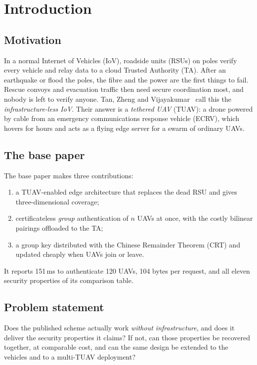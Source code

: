 \chapter{Introduction}\label{sec:intro}

\section{Motivation}
In a normal Internet of Vehicles (IoV), roadside units (RSUs) on poles verify every vehicle and relay data to a cloud Trusted Authority (TA).
After an earthquake or flood the poles, the fibre and the power are the first things to fail. Rescue convoys and evacuation traffic then need secure
coordination most, and nobody is left to verify anyone. Tan, Zheng and Vijayakumar~\cite{base} call this the \emph{infrastructure-less IoV}.
Their answer is a \emph{tethered UAV} (TUAV): a drone powered by cable from an emergency communications response vehicle (ECRV), which hovers for hours
and acts as a flying edge server for a swarm of ordinary UAVs.

\section{The base paper}
The base paper makes three contributions:
\begin{enumerate}[label=\textbf{(\roman*)}]
  \item a TUAV-enabled edge architecture that replaces the dead RSU and gives three-dimensional coverage;
  \item certificateless \emph{group} authentication of $n$ UAVs at once, with the costly bilinear pairings offloaded to the TA;
  \item a group key distributed with the Chinese Remainder Theorem (CRT) and updated cheaply when UAVs join or leave.
\end{enumerate}
It reports 151\,ms to authenticate 120 UAVs, 104 bytes per request, and all eleven security properties of its comparison table.

\section{Problem statement}
\begin{keybox}[title={Research question}]
Does the published scheme actually work \emph{without infrastructure}, and does it deliver the security properties it claims? If not, can those
properties be recovered together, at comparable cost, and can the same design be extended to the vehicles and to a multi-TUAV deployment?
\end{keybox}

